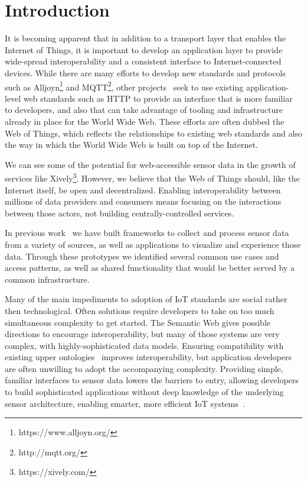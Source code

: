 \documentclass{acm_proc_article-sp}
\begin{document}
\section{Introduction}

It is becoming apparent that in addition to a transport layer that enables the
Internet of Things, it is important to develop an application layer to provide
wide-spread interoperability and a consistent interface to Internet-connected
devices. While there are many efforts to develop new standards and
protocols such as Alljoyn\footnote{https://www.alljoyn.org/} and
MQTT\footnote{http://mqtt.org/}, other projects~\cite{guinard2010} seek to
use existing application-level web standards such as HTTP to provide an
interface that is more familiar to developers, and also that can take advantage
of tooling and infrastructure already in place for the World Wide Web.
These efforts are often dubbed the Web of Things, which reflects the
relationships to existing web standards and also the way in which the World
Wide Web is built on top of the Internet.

We can see some of the potential for web-accessible sensor data in the growth
of services like Xively\footnote{https://xively.com/}. However, we believe that
the Web of Things should, like the Internet itself, be open and decentralized.
Enabling interoperability between millions of data providers and consumers
means focusing on the interactions between those actors, not building
centrally-controlled services.

In previous work~\cite{doppellab}\cite{gestures} we have built frameworks to collect
and process sensor data from a variety of sources, as well as applications to
visualize and experience those data. Through these prototypes we identified
several common use cases and access patterns, as well as shared functionality
that would be better served by a common infrastructure.

Many of the main impediments to adoption of IoT standards are social rather
then technological. Often solutions require developers to take on too much
simultaneous complexity to get started. The Semantic Web gives possible
directions to encourage interoperability, but many of those systems are very
complex, with highly-sophisticated data models. Ensuring compatibility with
existing upper ontologies~\cite{w3contology}\cite{broring2011}\cite{eid2007}
improves interoperability, but application developers are often unwilling to
adopt the accompanying complexity. Providing simple, familiar interfaces to
sensor data lowers the barriers to entry, allowing developers to build
sophisticated applications without deep knowledge of the underlying sensor
architecture, enabling smarter, more efficient IoT systems~\cite{aldrich2013}.
\end{document}
